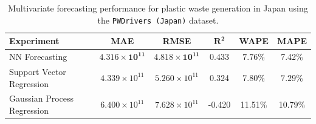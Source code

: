 \begin{table}[!ht]
	\centering
	\caption{\centering Multivariate forecasting performance for plastic waste generation in Japan using the \texttt{PWDrivers (Japan)} dataset.}
	\begin{tabular}{@{}lccccc@{}}
		\toprule
		\textbf{Experiment}         & \textbf{MAE}                      & \textbf{RMSE}                     & $\mathbf{R^2}$     & \textbf{WAPE}       & \textbf{MAPE}       \\
		\midrule
		NN Forecasting              & \(\mathbf{4.316 \times 10^{11}}\) & \(\mathbf{4.818 \times 10^{11}}\) & \(\mathbf{0.433}\) & \(\mathbf{7.76}\)\% & 7.42\%              \\
		Support Vector Regression   & \(4.339 \times 10^{11}\)          & \(5.260 \times 10^{11}\)          & 0.324              & 7.80\%              & \(\mathbf{7.29}\)\% \\
		Gaussian Process Regression & \(6.400 \times 10^{11}\)          & \(7.628 \times 10^{11}\)          & -0.420             & 11.51\%             & 10.79\%             \\
		\hline
	\end{tabular}
	\label{tab:multivariate_forecasting_japan_metrics}
\end{table}
